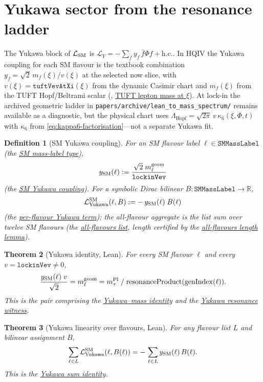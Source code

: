 \documentclass[11pt]{amsart}
\newtheorem{theorem}{Theorem}[section]
\newtheorem{definition}[theorem]{Definition}
\begin{document}
\section{Yukawa sector from the resonance ladder}
\label{sec:yukawa}

The Yukawa block of $\mathcal{L}_{\rm SM}$ is
$\mathcal{L}_Y=-\sum_f y_f\,\bar f\Phi f + \text{h.c.}$. In HQIV the Yukawa
coupling for each SM flavour is the textbook combination $y_f=\sqrt{2}\,
m_f(\xi)/v(\xi)$ at the selected now slice, with
$v(\xi)=\texttt{tuftVevAtXi}(\xi)$ from the dynamic Casimir chart and
$m_f(\xi)$ from the TUFT Hopf/Beltrami scalar
(\cite{hqiv-tuft-dynamic-mass-spectrum-paper},
\hyperref[lean:tuft-lepton-mass]{TUFT lepton mass at $\xi$}).
At lock-in the archived geometric ladder in
\texttt{papers/archive/lean\_to\_mass\_spectrum/} remains available as a
diagnostic, but the physical chart uses $\Lambda_{\mathrm{Hopf}}=\sqrt{2\pi}\,v\,\kappa_6(\xi,\Phi,t)$
with $\kappa_6$ from \eqref{eq:kappa6-factorisation}---not a separate
Yukawa fit.

\begin{definition}[SM Yukawa coupling]
\label{def:yukawa}
For an SM flavour label $\ell\in\texttt{SMMassLabel}$ (the
\hyperref[lean:sm-mass-label-type]{SM mass-label type}),
\[
y_{\rm SM}(\ell)
:= \frac{\sqrt{2}\;m_\ell^{\mathrm{geom}}}{\texttt{lockinVev}}
\]
(the \hyperref[lean:y-SM]{SM Yukawa coupling}). For a symbolic Dirac bilinear
$B:\texttt{SMMassLabel}\to\mathbb{R}$,
\[
\mathcal{L}^{\rm SM}_{\rm Yukawa}(\ell, B)
:= -\,y_{\rm SM}(\ell)\;B(\ell)
\]
(the \hyperref[lean:L-SM-Yukawa]{per-flavour Yukawa term}); the all-flavour
aggregate is the list sum over twelve SM flavours (the
\hyperref[lean:all-flavours]{all-flavours list}, length certified by the
\hyperref[lean:all-flavours-len]{all-flavours length lemma}).
\end{definition}

\begin{theorem}[Yukawa identity, Lean]
\label{thm:yukawa-identity}
For every SM flavour $\ell$ and every $v=\texttt{lockinVev}\neq 0$,
\[
\frac{y_{\rm SM}(\ell)\;v}{\sqrt{2}} = m_\ell^{\mathrm{geom}}
= m_\tau^{\rm Pl}\;/\;\mathrm{resonanceProduct}(\mathrm{genIndex}(\ell)).
\]
This is the pair comprising the
\hyperref[lean:yukawa-mass]{Yukawa--mass identity} and the
\hyperref[lean:yukawa-resonance]{Yukawa resonance witness}.
\end{theorem}

\begin{theorem}[Yukawa linearity over flavours, Lean]
\label{thm:yukawa-sum}
For any flavour list $L$ and bilinear assignment $B$,
\[
\sum_{\ell\in L} \mathcal{L}^{\rm SM}_{\rm Yukawa}(\ell, B(\ell))
= -\,\sum_{\ell\in L} y_{\rm SM}(\ell)\,B(\ell) .
\]
This is the \hyperref[lean:yukawa-sum]{Yukawa sum identity}.
\end{theorem}
\end{document}
